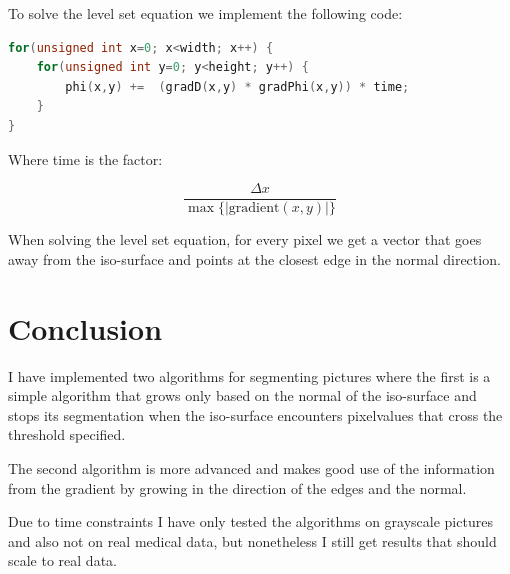 To solve the level set equation we implement the following code:
\begin{lstlisting}[language=c++]
for(unsigned int x=0; x<width; x++) {
    for(unsigned int y=0; y<height; y++) {
        phi(x,y) +=  (gradD(x,y) * gradPhi(x,y)) * time;
    }
}
\end{lstlisting}

Where time is the factor:

\begin{equation*}
  \dfrac{\Delta x} {\max \{|\textrm{gradient}(x,y)|\}} 
\end{equation*}

When solving the level set equation, for every pixel we get a vector
that goes away from the iso-surface and points at the closest edge in
the normal direction.


\section{Conclusion}
\label{segmentation:conclusion}

I have implemented two algorithms for segmenting pictures where the
first is a simple algorithm that grows only based on the normal of the
iso-surface and stops its segmentation when the iso-surface encounters
pixelvalues that cross the threshold specified.

The second algorithm is more advanced and makes good use of the
information from the gradient by growing in the direction of the edges
and the normal.

Due to time constraints I have only tested the algorithms on grayscale
pictures and also not on real medical data, but nonetheless I still
get results that should scale to real data.

